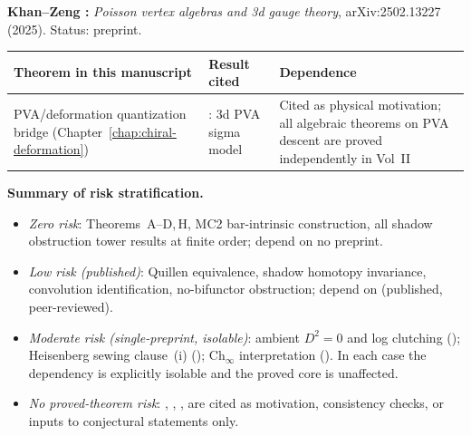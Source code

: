 \begin{remark}
\medskip
\noindent\textbf{Khan--Zeng \cite{KhanZeng25}:}
\emph{Poisson vertex algebras and 3d gauge theory},
arXiv:2502.13227 (2025). Status: preprint.

\smallskip
\renewcommand{\arraystretch}{1.25}
\noindent
\begin{tabular}{p{4.8cm}p{4.2cm}p{5.5cm}}
\textbf{Theorem in this manuscript}
 & \textbf{Result cited}
 & \textbf{Dependence} \\
\hline
PVA/deformation quantization bridge
 (Chapter~\ref{chap:chiral-deformation})
 & \cite{KhanZeng25}: 3d PVA sigma model
 & Cited as physical motivation; all algebraic
 theorems on PVA descent are proved independently
 in Vol~II
\end{tabular}

\medskip
\noindent\textbf{Summary of risk stratification.}
\begin{itemize}[nosep]
\item \emph{Zero risk}: Theorems~A--D,\,H, MC2 bar-intrinsic
 construction, all shadow obstruction tower results at finite order;
 depend on no preprint.
\item \emph{Low risk (published)}: Quillen equivalence, shadow
 homotopy invariance, convolution identification, no-bifunctor
 obstruction; depend on \cite{RNW19, Val16} (published,
 peer-reviewed).
\item \emph{Moderate risk (single-preprint, isolable)}:
 ambient $D^2 = 0$ and log clutching (\cite{Mok25});
 Heisenberg sewing clause~(i) (\cite{Moriwaki26b});
 $\mathrm{Ch}_\infty$ interpretation (\cite{MS24}).
 In each case the dependency is explicitly isolable and the
 proved core is unaffected.
\item \emph{No proved-theorem risk}: \cite{GZ26},
 \cite{KhanZeng25}, \cite{AMT24}, \cite{Vic25}
 are cited as motivation, consistency checks, or inputs to
 conjectural statements only.
\end{itemize}
\end{remark}

